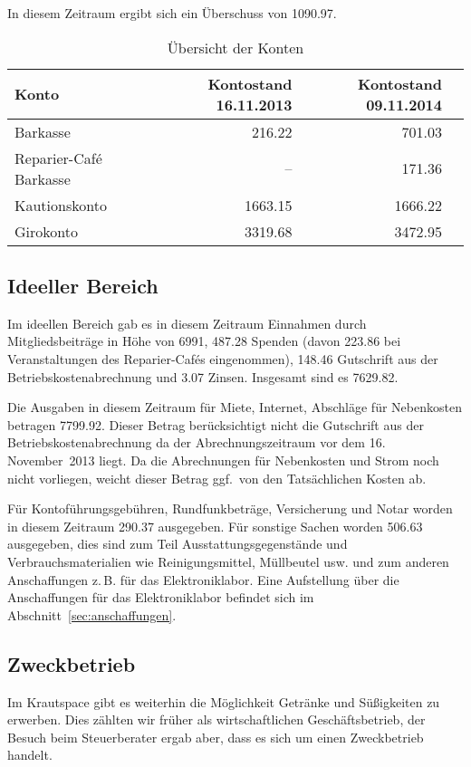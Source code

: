 \documentclass[ngerman]{scrartcl}
\begin{document}
In diesem Zeitraum ergibt sich ein Überschuss von \SI{1090,97}{\EUR}.

\begin{table}[h!]
  \centering{}
	\begin{tabular}{l|r|r|r}
          \toprule
	\textbf{Konto} & \textbf{Kontostand 16.11.2013} & \textbf{Kontostand 09.11.2014} \\
          \midrule
	Barkasse & \SI{216,22}{\EUR} & \SI{701,03}{\EUR} \\
	Reparier-Café Barkasse & -- & \SI{171,36}{\EUR} \\
	Kautionskonto & \SI{1663,15}{\EUR} & \SI{1666,22}{\EUR} \\
	Girokonto & \SI{3319,68}{\EUR} & \SI{3472,95}{\EUR}
	\end{tabular}
\caption{Übersicht der Konten}
\end{table}

\subsection{Ideeller Bereich}
\label{sec:ideeller_bereich}

Im ideellen Bereich gab es in diesem Zeitraum Einnahmen durch Mitgliedsbeiträge in Höhe von \SI{6991}{\EUR}, \SI{487,28}{\EUR} Spenden (davon \SI{223,86}{\EUR} bei Veranstaltungen des Reparier-Cafés eingenommen), \SI{148,46}{\EUR} Gutschrift aus der Betriebskostenabrechnung und \SI{3,07}{\EUR} Zinsen.
Insgesamt sind es \SI{7629,82}{\EUR}.

Die Ausgaben in diesem Zeitraum für Miete, Internet, Abschläge für Nebenkosten betragen \SI{7799,92}{\EUR}.
Dieser Betrag berücksichtigt nicht die Gutschrift aus der Betriebskostenabrechnung da der Abrechnungszeitraum vor dem 16.\,November~2013 liegt.
Da die Abrechnungen für Nebenkosten und Strom noch nicht vorliegen, weicht dieser Betrag ggf.\ von den Tatsächlichen Kosten ab.

Für Kontoführungsgebühren, Rundfunkbeträge, Versicherung und Notar worden in diesem Zeitraum \SI{290,37}{\EUR} ausgegeben.
Für sonstige Sachen worden \SI{506,63}{\EUR} ausgegeben, dies sind zum Teil Ausstattungsgegenstände und Verbrauchsmaterialien wie Reinigungsmittel, Müllbeutel usw. und zum anderen Anschaffungen z.\,B. für das Elektroniklabor. Eine Aufstellung über die Anschaffungen für das Elektroniklabor befindet sich im Abschnitt~\ref{sec:anschaffungen}.

\subsection{Zweckbetrieb}
\label{sec:Zweckbetrieb}
Im Krautspace gibt es weiterhin die Möglichkeit Getränke und Süßigkeiten zu erwerben.
Dies zählten wir früher als wirtschaftlichen Geschäftsbetrieb, der Besuch beim Steuerberater ergab aber, dass es sich um einen Zweckbetrieb handelt.
\end{document}
